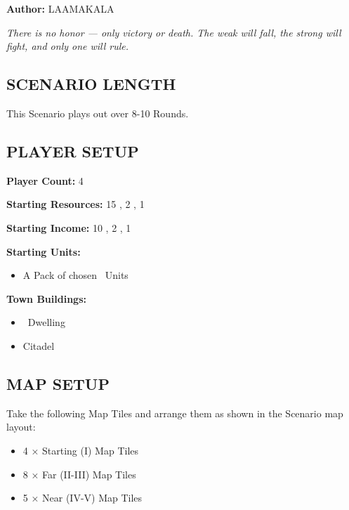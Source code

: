 
\begin{multicols*}{2}

\textbf{Author:} LAAMAKALA

\textit{There is no honor — only victory or death. The weak will fall, the strong will fight, and only one will rule.}

\subsection*{\MakeUppercase{Scenario Length}}
This Scenario plays out over 8-10 Rounds.

\subsection*{\MakeUppercase{Player Setup}}
\textbf{Player Count:} 4

\textbf{Starting Resources:} 15 , 2 , 1 

\textbf{Starting Income:} 10 , 2 , 1 

\textbf{Starting Units:}
\begin{itemize}\begin{center}
•
\end{center}
  \item A Pack of chosen \bronze\ Units
\end{itemize}

\textbf{Town Buildings:}
\begin{itemize}
  \item \bronze\ Dwelling
  \item Citadel
\end{itemize}

\subsection*{\MakeUppercase{Map Setup}}
Take the following Map Tiles and arrange them as shown in the Scenario map layout:

\begin{itemize}
  \item 4 × Starting (I) Map Tiles
  \item 8 × Far (II-III) Map Tiles
  \item 5 × Near (IV-V) Map Tiles
\end{itemize}


\end{multicols*}
